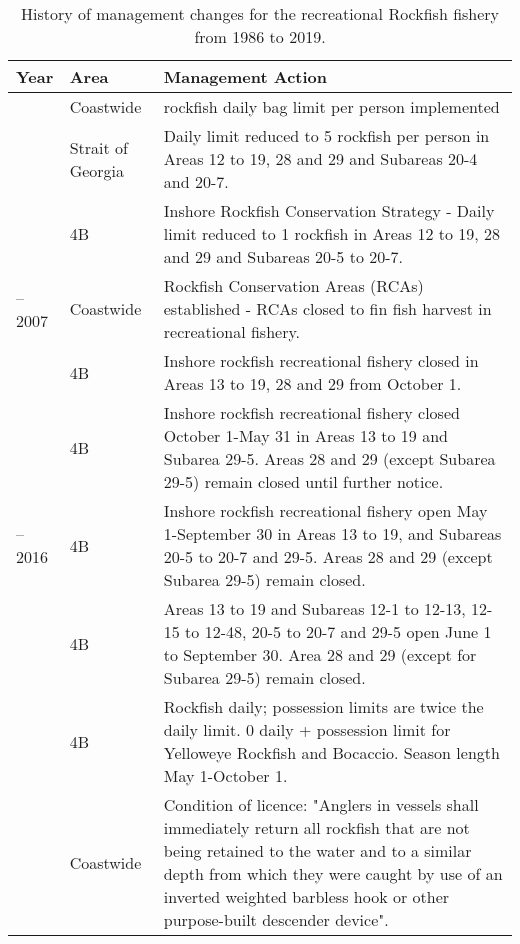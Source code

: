 \documentclass[11pt]{book}
\begin{document}
\clearpage
\begin{longtable}[t]{>{\raggedright\arraybackslash}p{2.5cm}>{\raggedright\arraybackslash}p{1.75cm}>{\raggedright\arraybackslash}p{7.5cm}}
\caption{\label{tab:rec-mgt-changes}History of management changes for the recreational Rockfish fishery from 1986 to 2019.}\\
\toprule
\textbf{Year} & \textbf{Area} & \textbf{Management Action}\\
\midrule
1986 & Coastwide & 8 rockfish daily bag limit per person implemented\\
1992 & Strait of Georgia & Daily limit reduced to 5 rockfish per person in Areas 12 to 19, 28 and 29 and Subareas 20-4 and 20-7.\\
2002 & 4B & Inshore Rockfish Conservation Strategy - Daily limit reduced to 1 rockfish in Areas 12 to 19, 28 and 29 and Subareas 20-5 to 20-7.\\
2002--2007 & Coastwide & Rockfish Conservation Areas (RCAs) established - RCAs closed to fin fish harvest in recreational fishery.\\
2006 & 4B & Inshore rockfish recreational fishery closed in Areas 13 to 19, 28 and 29 from October 1.\\
2007 & 4B & Inshore rockfish recreational fishery closed October 1-May 31 in Areas 13 to 19 and Subarea 29-5. Areas 28 and 29 (except Subarea 29-5) remain closed until further notice.\\
2008--2016 & 4B & Inshore rockfish recreational fishery open May 1-September 30 in Areas 13 to 19, and Subareas 20-5 to 20-7 and 29-5. Areas 28 and 29 (except Subarea 29-5) remain closed.\\
2017 & 4B & Areas 13 to 19 and Subareas 12-1 to 12-13, 12-15 to 12-48, 20-5 to 20-7 and 29-5 open June 1 to September 30. Area 28 and 29 (except for Subarea 29-5) remain closed.\\
2019 & 4B & 1 Rockfish daily; possession limits are twice the daily limit. 0 daily + possession limit for Yelloweye Rockfish and Bocaccio. Season length May 1-October 1.\\
2019 & Coastwide & Condition of licence: "Anglers in vessels shall immediately return all rockfish that are not being retained to the water and to a similar depth from which they were caught by use of an inverted weighted barbless hook or other purpose-built descender device".\\
\bottomrule
\end{longtable}

\clearpage
\end{document}
